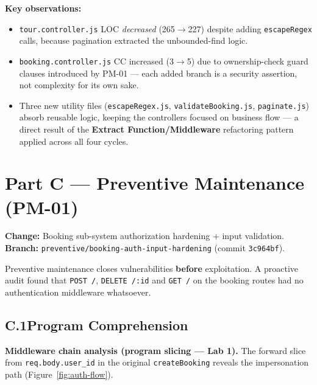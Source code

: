 \documentclass[11pt,a4paper]{article}
\begin{document}
\noindent\textbf{Key observations:}
\begin{itemize}
  \item \texttt{tour.controller.js} LOC \emph{decreased} (265$\to$227) despite adding
        \texttt{escapeRegex} calls, because pagination extracted the unbounded-find logic.
  \item \texttt{booking.controller.js} CC increased (3$\to$5) due to ownership-check
        guard clauses introduced by PM-01 --- each added branch is a security assertion,
        not complexity for its own sake.
  \item Three new utility files (\texttt{escapeRegex.js}, \texttt{validateBooking.js},
        \texttt{paginate.js}) absorb reusable logic, keeping the controllers focused on
        business flow --- a direct result of the \textbf{Extract Function/Middleware}
        refactoring pattern applied across all four cycles.
\end{itemize}

\newpage
\section{Part C --- Preventive Maintenance (PM-01)}

\noindent\textbf{Change:} Booking sub-system authorization hardening + input validation.\\[2pt]
\textbf{Branch:} \texttt{preventive/booking-auth-input-hardening} (commit \texttt{3c964bf}).

Preventive maintenance closes vulnerabilities \textbf{before} exploitation.
A proactive audit found that \texttt{POST /}, \texttt{DELETE /:id} and \texttt{GET /}
on the booking routes had no authentication middleware whatsoever.

\subsection{C.1\quad Program Comprehension}

\noindent\textbf{Middleware chain analysis (program slicing --- Lab 1).}
The forward slice from \texttt{req.body.user\_id} in the original \texttt{createBooking}
reveals the impersonation path (Figure~\ref{fig:auth-flow}).
\end{document}
